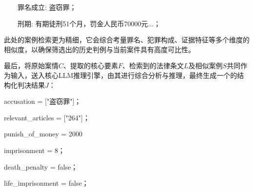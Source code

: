 \ \ \ \ 罪名成立: 盗窃罪；

\ \ \ \ 刑期: 有期徒刑51个月，罚金人民币70000元...；

此处的案例检索更为精细，它会综合考量罪名、犯罪构成、证据特征等多个维度的相似度，以确保筛选出的历史判例与当前案件具有高度可比性。

最后，将原始案情$C$、提取的核心要素$F$、检索到的法律条文$L$及相似案例$S$共同作为输入，送入核心LLM推理引擎，由其进行综合分析与推理，最终生成一个的结构化判决结果$J$：

accusation = ["盗窃罪"]；

relevant\_articles = ["264"]；

punish\_of\_money = 2000

imprisonment = 8；

death\_penalty = false；

life\_imprisonment = false；
